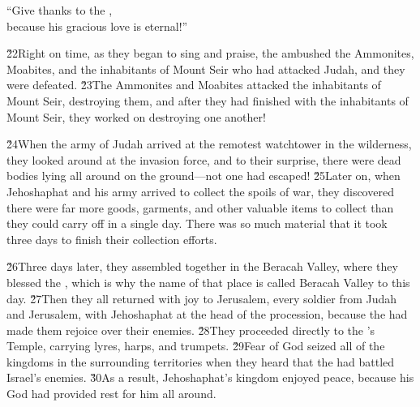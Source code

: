 \begin{poetry}
\poeml ``Give thanks to the , \\
\poemll    because his gracious love is eternal!''
\end{poetry}

\v{22}Right on time, as they began to sing and praise, the  ambushed the Ammonites, Moabites, and the inhabitants of Mount Seir who had attacked Judah, and they were defeated. \v{23}The Ammonites and Moabites attacked the inhabitants of Mount Seir, destroying them, and after they had finished with the inhabitants of Mount Seir, they worked on destroying one another!

\v{24}When the army of Judah arrived at the remotest watchtower in the wilderness, they looked around at the invasion force, and to their surprise, there were dead bodies lying all around on the ground---not one had escaped! \v{25}Later on, when Jehoshaphat and his army arrived to collect the spoils of war, they discovered there were far more goods, garments, and other valuable items to collect than they could carry off in a single day. There was so much material that it took three days to finish their collection efforts.

\v{26}Three days later, they assembled together in the Beracah Valley, where they blessed the , which is why the name of that place is called Beracah Valley to this day. \v{27}Then they all returned with joy to Jerusalem, every soldier from Judah and Jerusalem, with Jehoshaphat at the head of the procession, because the  had made them rejoice over their enemies. \v{28}They proceeded directly to the 's Temple, carrying lyres, harps, and trumpets. \v{29}Fear of God seized all of the kingdoms in the surrounding territories when they heard that the  had battled Israel's enemies. \v{30}As a result, Jehoshaphat's kingdom enjoyed peace, because his God had provided rest for him all around.

